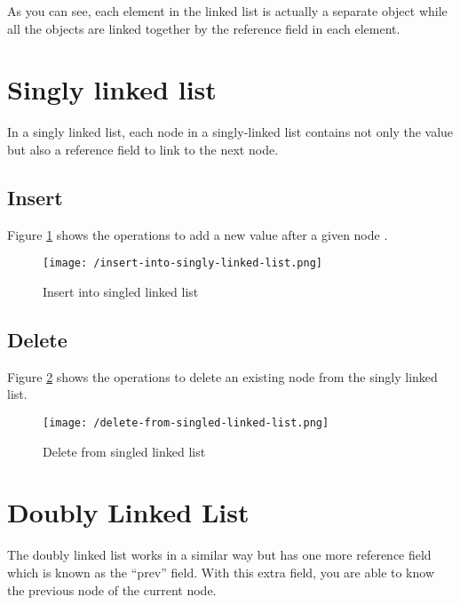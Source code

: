 As you can see, each element in the linked list is actually a separate object while all the objects are linked together by the reference field in each element.



\section{Singly linked list}
\label{sec:singly-linked-list}

In a singly linked list, each node in a singly-linked list contains not only the value but also a reference field to link to the next node. 

\subsection{Insert}

Figure \ref{fig:insert-into-linked-list} shows the operations to add a new value after a given node .

\begin{figure}[!ht]
  \centering
  \texttt{[image: /insert-into-singly-linked-list.png]}
  \caption{Insert into singled linked list}
  \label{fig:insert-into-linked-list}
\end{figure}



\subsection{Delete}


Figure \ref{fig:delete-from-singled-linked-list} shows the operations to delete an existing node  from the singly linked list.

\begin{figure}[!ht]
  \centering
  \texttt{[image: /delete-from-singled-linked-list.png]}
  \caption{Delete from singled linked list}
  \label{fig:delete-from-singled-linked-list}
\end{figure}



\section{Doubly Linked List}
\label{sec:doubly-linked-list}

The doubly linked list works in a similar way but has one more reference field which is known as the ``prev'' field.
With this extra field, you are able to know the previous node of the current node.


